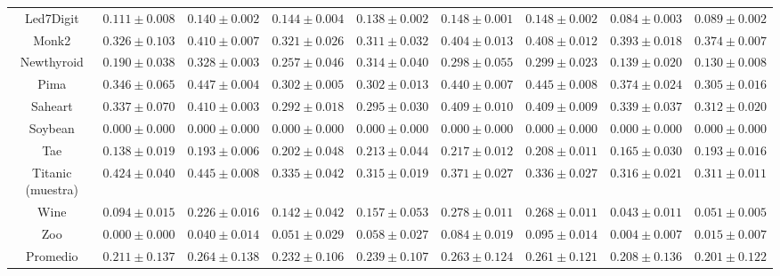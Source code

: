 \begin{landscape}
\begin{table}
{\begin{tabular}{|c|cccccccc|}
	Led7Digit & $0.111 \pm 0.008$ & $0.140 \pm 0.002$ & $0.144 \pm 0.004$ & $0.138 \pm 0.002$ & $0.148 \pm 0.001$ & $0.148 \pm 0.002$ & $0.084 \pm 0.003$ & $0.089 \pm 0.002$\\ 
	Monk2 & $0.326 \pm 0.103$ & $0.410 \pm 0.007$ & $0.321 \pm 0.026$ & $0.311 \pm 0.032$ & $0.404 \pm 0.013$ & $0.408 \pm 0.012$ & $0.393 \pm 0.018$ & $0.374 \pm 0.007$\\ 
	Newthyroid & $0.190 \pm 0.038$ & $0.328 \pm 0.003$ & $0.257 \pm 0.046$ & $0.314 \pm 0.040$ & $0.298 \pm 0.055$ & $0.299 \pm 0.023$ & $0.139 \pm 0.020$ & $0.130 \pm 0.008$\\ 
	Pima & $0.346 \pm 0.065$ & $0.447 \pm 0.004$ & $0.302 \pm 0.005$ & $0.302 \pm 0.013$ & $0.440 \pm 0.007$ & $0.445 \pm 0.008$ & $0.374 \pm 0.024$ & $0.305 \pm 0.016$\\ 
	Saheart & $0.337 \pm 0.070$ & $0.410 \pm 0.003$ & $0.292 \pm 0.018$ & $0.295 \pm 0.030$ & $0.409 \pm 0.010$ & $0.409 \pm 0.009$ & $0.339 \pm 0.037$ & $0.312 \pm 0.020$\\ 
	Soybean & $0.000 \pm 0.000$ & $0.000 \pm 0.000$ & $0.000 \pm 0.000$ & $0.000 \pm 0.000$ & $0.000 \pm 0.000$ & $0.000 \pm 0.000$ & $0.000 \pm 0.000$ & $0.000 \pm 0.000$\\ 
	Tae & $0.138 \pm 0.019$ & $0.193 \pm 0.006$ & $0.202 \pm 0.048$ & $0.213 \pm 0.044$ & $0.217 \pm 0.012$ & $0.208 \pm 0.011$ & $0.165 \pm 0.030$ & $0.193 \pm 0.016$\\ 
	Titanic (muestra) & $0.424 \pm 0.040$ & $0.445 \pm 0.008$ & $0.335 \pm 0.042$ & $0.315 \pm 0.019$ & $0.371 \pm 0.027$ & $0.336 \pm 0.027$ & $0.316 \pm 0.021$ & $0.311 \pm 0.011$\\ 
	Wine & $0.094 \pm 0.015$ & $0.226 \pm 0.016$ & $0.142 \pm 0.042$ & $0.157 \pm 0.053$ & $0.278 \pm 0.011$ & $0.268 \pm 0.011$ & $0.043 \pm 0.011$ & $0.051 \pm 0.005$\\ 
	Zoo & $0.000 \pm 0.000$ & $0.040 \pm 0.014$ & $0.051 \pm 0.029$ & $0.058 \pm 0.027$ & $0.084 \pm 0.019$ & $0.095 \pm 0.014$ & $0.004 \pm 0.007$ & $0.015 \pm 0.007$\\ 
	\hline
	Promedio & $0.211 \pm 0.137$ & $0.264 \pm 0.138$ & $0.232 \pm 0.106$ & $0.239 \pm 0.107$ & $0.263 \pm 0.124$ & $0.261 \pm 0.121$ & $0.208 \pm 0.136$ & $0.201 \pm 0.122$\\ 
	\hline
	\end{tabular}
}
\end{table}




\end{landscape}
